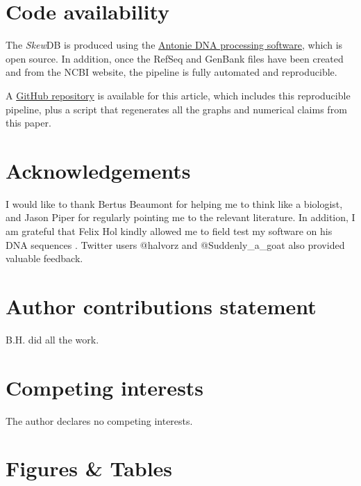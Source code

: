 \documentclass[fleqn,10pt]{wlscirep}
\begin{document}
\section*{Code availability}
The \emph{Skew}DB is produced using the \href{https://github.eu/berthubert/antonie2}{Antonie DNA processing software}, which is open source. In addition, once the RefSeq and GenBank files have been created and from the NCBI website, the pipeline is fully automated and reproducible. 

A \href{https://github.com/berthubert/skewdb-articles}{GitHub repository} is available for this article, which includes this reproducible pipeline, plus a script that regenerates all the graphs and numerical claims from this paper. 




\section*{Acknowledgements} 

I would like to thank Bertus Beaumont for helping me to think like a biologist, and Jason Piper for regularly pointing me to the relevant literature. In addition, I am grateful that Felix Hol kindly allowed me to field test my software on his DNA sequences \cite{hol_density-dependent_2016}. Twitter users @halvorz and @Suddenly\_a\_goat also provided valuable feedback.

\section*{Author contributions statement}

B.H. did all the work.

\section*{Competing interests}
The author declares no competing interests.

\section*{Figures \& Tables}
\newcommand{\comment}[1]{}
\end{document}
